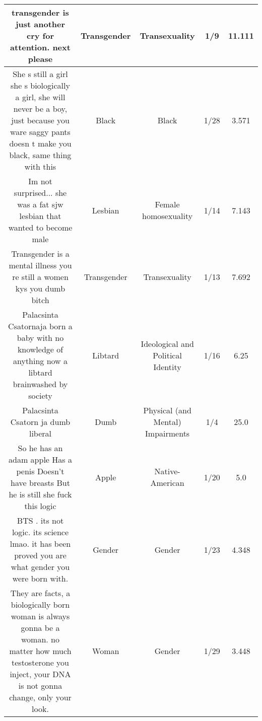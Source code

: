 \documentclass[11pt]{article}
\newlength\mylength
\begin{document}
\begin{center}
\begin{longtable}{|C{.40\mylength}|C{.30\mylength}|C{.15\mylength}|C{.15\mylength}|C{.15\mylength}|}
  transgender is just another cry for attention. next please  & Transgender & Transexuality & 1/9 & 11.111 \\  \hline
  She s still a girl she s  biologically a girl, she will never be a boy, just because you ware saggy pants doesn t make you black, same thing with this  & Black & Black & 1/28 & 3.571 \\  \hline
  Im not surprised... she was a fat sjw lesbian that wanted to  become  male  & Lesbian & Female homosexuality & 1/14 & 7.143 \\  \hline
  Transgender is a mental illness you re still a women kys you dumb bitch  & Transgender & Transexuality & 1/13 & 7.692 \\  \hline
  Palacsinta Csatornaja born a baby with no knowledge of anything now a libtard brainwashed by society  & Libtard &  Ideological and Political Identity & 1/16 & 6.25 \\  \hline
  Palacsinta Csatorn ja dumb liberal  & Dumb & Physical (and Mental) Impairments & 1/4 & 25.0 \\  \hline
  So he has an adam apple Has a penis Doesn't have breasts But he is still she fuck this logic  & Apple & Native-American & 1/20 & 5.0 \\  \hline
   BTS                  . its not logic. its science lmao. it has been proved you are what gender you were born with.  & Gender & Gender & 1/23 & 4.348 \\  \hline
  They are facts, a biologically born woman is always gonna be a woman. no matter how much testosterone you inject, your DNA is not gonna change, only your look.  & Woman & Gender & 1/29 & 3.448 \\  \hline

\end{longtable}
\end{center}
\end{document}
